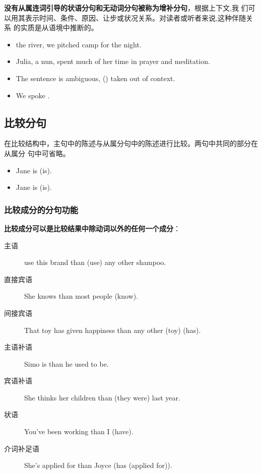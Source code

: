 \textbf{没有从属连词引导的状语分句和无动词分句被称为增补分句}，根据上下文,我
们可以用其表示时间、条件、原因、让步或状况关系。对读者或听者来说,这种伴随关系
的实质是从语境中推断的。
\begin{itemize}
\item {} the river, we pitched camp for the night.
\item Julia,  a nun, spent much of her time in
  prayer and meditation.
\item The sentence is ambiguous, () taken out of context.

\item We spoke .
\end{itemize}

\subsection{比较分句}

在比较结构中，主句中的陈述与从属分句中的陈述进行比较。两句中共同的部分在从属分
句中可省略。
\begin{itemize}
\item Jane is     (is).
\item Jane is    (is).
\end{itemize}

\subsubsection{比较成分的分句功能}

\textbf{比较成分可以是比较结果中除动词以外的任何一个成分}：
\begin{description}
\item[主语]  use this brand than (use) any other shampoo.

\item[直接宾语] She knows  than most people (know).

\item[间接宾语] That toy has given  happiness than any other (toy) (has).

\item[主语补语] Simo is  than he used to be.

\item[宾语补语] She thinks her children  than (they were) last year.
\item[状语] You've been working  than I (have).

\item[介词补足语] She's applied for  than Joyce (has (applied for)).
\end{description}

